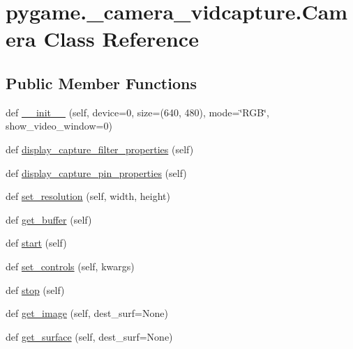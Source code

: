 \hypertarget{classpygame_1_1__camera__vidcapture_1_1_camera}{}\section{pygame.\+\_\+camera\+\_\+vidcapture.\+Camera Class Reference}
\label{classpygame_1_1__camera__vidcapture_1_1_camera}
\subsection*{Public Member Functions}
\begin{DoxyCompactItemize}
\item 
def \hyperlink{classpygame_1_1__camera__vidcapture_1_1_camera_ad12b0b95400eb62c70bb4dfe4fd31462}{\+\_\+\+\_\+init\+\_\+\+\_\+} (self, device=0, size=(640, 480), mode=\char`\"{}R\+GB\char`\"{}, show\+\_\+video\+\_\+window=0)
\item 
def \hyperlink{classpygame_1_1__camera__vidcapture_1_1_camera_a5274f7f59d7a94411277871199a2ba62}{display\+\_\+capture\+\_\+filter\+\_\+properties} (self)
\item 
def \hyperlink{classpygame_1_1__camera__vidcapture_1_1_camera_af5100bba3cb1230bc1b4f977054d432a}{display\+\_\+capture\+\_\+pin\+\_\+properties} (self)
\item 
def \hyperlink{classpygame_1_1__camera__vidcapture_1_1_camera_a4bccaf17ba21d8f8cb604021df667c3d}{set\+\_\+resolution} (self, width, height)
\item 
def \hyperlink{classpygame_1_1__camera__vidcapture_1_1_camera_a85a1c85511d66558ee6cd85350339e39}{get\+\_\+buffer} (self)
\item 
def \hyperlink{classpygame_1_1__camera__vidcapture_1_1_camera_a00cff0a842797ba4a9a0a90bec899769}{start} (self)
\item 
def \hyperlink{classpygame_1_1__camera__vidcapture_1_1_camera_a1f8f7778475d474010943a72426c2c0f}{set\+\_\+controls} (self, kwargs)
\item 
def \hyperlink{classpygame_1_1__camera__vidcapture_1_1_camera_a9e14f2a8ddfac2f864e54684c71df7f7}{stop} (self)
\item 
def \hyperlink{classpygame_1_1__camera__vidcapture_1_1_camera_a1d7a082938a1e36c20728befdaa19518}{get\+\_\+image} (self, dest\+\_\+surf=None)
\item 
def \hyperlink{classpygame_1_1__camera__vidcapture_1_1_camera_adde175233ce53662b3849d6430723610}{get\+\_\+surface} (self, dest\+\_\+surf=None)
\end{DoxyCompactItemize}
